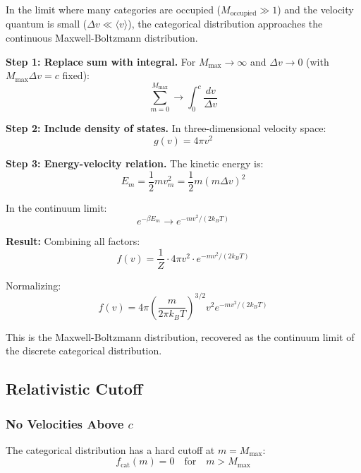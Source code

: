 In the limit where many categories are occupied ($M_{\text{occupied}} \gg 1$) and the velocity quantum is small ($\Delta v \ll \langle v \rangle$), the categorical distribution approaches the continuous Maxwell-Boltzmann distribution.

\textbf{Step 1: Replace sum with integral.} For $M_{\max} \to \infty$ and $\Delta v \to 0$ (with $M_{\max} \Delta v = c$ fixed):
\begin{equation}
\sum_{m=0}^{M_{\max}} \to \int_0^{c} \frac{dv}{\Delta v}
\end{equation}

\textbf{Step 2: Include density of states.} In three-dimensional velocity space:
\begin{equation}
g(v) = 4\pi v^2
\end{equation}

\textbf{Step 3: Energy-velocity relation.} The kinetic energy is:
\begin{equation}
E_m = \frac{1}{2}m v_m^2 = \frac{1}{2}m(m\Delta v)^2
\end{equation}

In the continuum limit:
\begin{equation}
e^{-\beta E_m} \to e^{-mv^2/(2k_B T)}
\end{equation}

\textbf{Result:} Combining all factors:
\begin{equation}
f(v) = \frac{1}{Z} \cdot 4\pi v^2 \cdot e^{-mv^2/(2k_B T)}
\end{equation}

Normalizing:
\begin{equation}
f(v) = 4\pi \left(\frac{m}{2\pi k_B T}\right)^{3/2} v^2 e^{-mv^2/(2k_B T)}
\end{equation}

This is the Maxwell-Boltzmann distribution, recovered as the continuum limit of the discrete categorical distribution.

\subsection{Relativistic Cutoff}

\subsubsection{No Velocities Above $c$}

The categorical distribution has a hard cutoff at $m = M_{\max}$:
\begin{equation}
f_{\text{cat}}(m) = 0 \quad \text{for} \quad m > M_{\max}
\end{equation}

